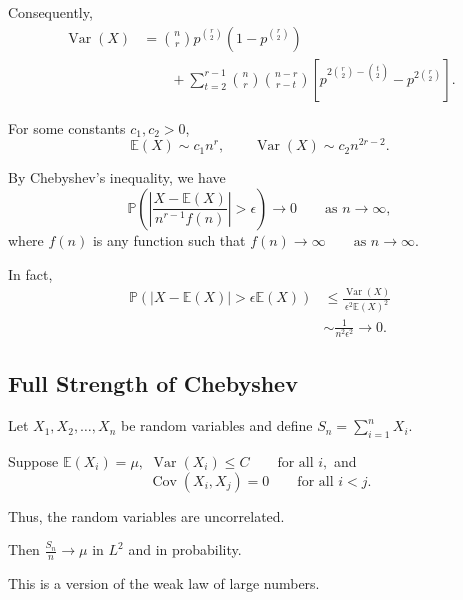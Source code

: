 Consequently,
\[
\begin{aligned}
    \operatorname{Var}(X)
    &=
    \binom{n}{r}
    p^{\binom{r}{2}}
    \left(
        1-p^{\binom{r}{2}}
    \right) \\
    &\qquad+
    \sum_{t=2}^{r-1}
    \binom{n}{r}
    \binom{n-r}{r-t}
    \left[
        p^{
            2\binom{r}{2}-\binom{t}{2}
        }
        -
        p^{2\binom{r}{2}}
    \right].
\end{aligned}
\]

For some constants $c_1,c_2>0$,
\[
    \mathbb{E}(X)\sim c_1 n^r,
    \qquad
    \operatorname{Var}(X)\sim c_2 n^{2r-2}.
\]

By Chebyshev's inequality, we have
\[
    \mathbb{P}
    \left(
        \left|
            \frac{X-\mathbb{E}(X)}
            {n^{r-1}f(n)}
        \right|
        >\epsilon
    \right)
    \longrightarrow 0
    \qquad\text{as }n\to\infty,
\]
where $f(n)$ is any function such that
\(
    f(n)\longrightarrow\infty
    \qquad\text{as }n\to\infty.
\)

In fact,
\[
\begin{aligned}
    \mathbb{P}
    \left(
        |X-\mathbb{E}(X)|
        >
        \epsilon\mathbb{E}(X)
    \right)
    &\leq
    \frac{
        \operatorname{Var}(X)
    }{
        \epsilon^2\mathbb{E}(X)^2
    } \\
    &\sim
    \frac{1}{n^2\epsilon^2}
    \longrightarrow 0.
\end{aligned}
\]


\subsection{Full Strength of Chebyshev}

Let
\(
    X_1,X_2,\ldots,X_n
\)
be random variables and define
\(
    S_n=\sum_{i=1}^{n}X_i.
\)

Suppose
\(
    \mathbb{E}(X_i)=\mu,
\)
\(
    \operatorname{Var}(X_i)\leq C
    \qquad\text{for all }i,
\)
and
\[
    \operatorname{Cov}(X_i,X_j)=0
    \qquad\text{for all }i<j.
\]

Thus, the random variables are uncorrelated.

Then
\(
    \frac{S_n}{n}
    \longrightarrow
    \mu
\)
in $L^2$ and in probability.

This is a version of the weak law of large numbers.

